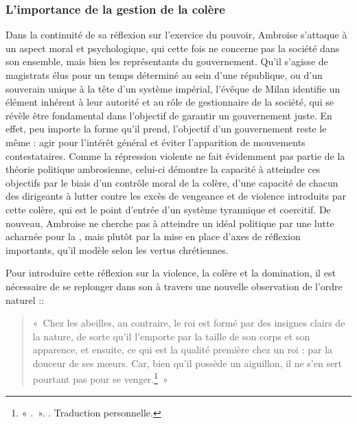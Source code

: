 \bigskip

\subsubsection{L'importance de la gestion de la colère}

Dans la continuité de sa réflexion sur l'exercice du pouvoir, Ambroise s'attaque à un aspect moral et psychologique, qui cette fois ne concerne pas la société dans son ensemble, mais bien les représentants du gouvernement. Qu'il s'agisse de magistrats élus pour un temps déterminé au sein d'une république, ou d'un souverain unique à la tête d'un système impérial, l'évêque de Milan identifie un élément inhérent à leur autorité et au rôle de gestionnaire de la société, qui se révèle être fondamental dans l'objectif de garantir un gouvernement juste. En effet, peu importe la forme qu'il prend, l'objectif d'un gouvernement reste le même : agir pour l'intérêt général et éviter l'apparition de mouvements contestataires. Comme la répression violente ne fait évidemment pas partie de la théorie politique ambrosienne, celui-ci démontre la capacité à atteindre ces objectifs par le biais d'un contrôle moral de la colère, d'une capacité de chacun des dirigeants à lutter contre les excès de vengeance et de violence introduits par cette colère, qui est le point d'entrée d'un système tyrannique et coercitif. De nouveau, Ambroise ne cherche pas à atteindre un idéal politique par une lutte acharnée pour la , mais plutôt par la mise en place d'axes de réflexion importants, qu'il modèle selon les vertus chrétiennes.

\bigskip

Pour introduire cette réflexion sur la violence, la colère et la domination, il est nécessaire de se replonger dans son  à travers une nouvelle observation de l'ordre naturel ::

\bigskip

\begin{quote}
    «~Chez les abeilles, au contraire, le roi est formé par des insignes clairs de la nature, de sorte qu'il l'emporte par la taille de son corps et son apparence, et ensuite, ce qui est la qualité première chez un roi : par la douceur de ses mœurs. Car, bien qu'il possède un aiguillon, il ne s'en sert pourtant pas pour se venger.\footnote{« .~». \cite[\nopp V, 21, 68]{ambroise_csel_32_1}. Traduction personnelle.}~»
\end{quote}

